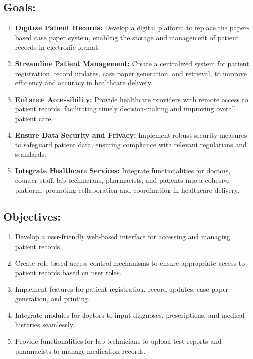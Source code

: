 \subsection{Goals:}

\begin{enumerate}
    \item \textbf{Digitize Patient Records:} Develop a digital platform to replace the paper-based case paper system, enabling the storage and management of patient records in electronic format.
    
    \item \textbf{Streamline Patient Management:} Create a centralized system for patient registration, record updates, case paper generation, and retrieval, to improve efficiency and accuracy in healthcare delivery.
    
    \item \textbf{Enhance Accessibility:} Provide healthcare providers with remote access to patient records, facilitating timely decision-making and improving overall patient care.
    
    \item \textbf{Ensure Data Security and Privacy:} Implement robust security measures to safeguard patient data, ensuring compliance with relevant regulations and standards.
    
    \item \textbf{Integrate Healthcare Services:} Integrate functionalities for doctors, counter staff, lab technicians, pharmacists, and patients into a cohesive platform, promoting collaboration and coordination in healthcare delivery.
\end{enumerate}

\subsection{Objectives:}

\begin{enumerate}
    \item Develop a user-friendly web-based interface for accessing and managing patient records.
    \item Create role-based access control mechanisms to ensure appropriate access to patient records based on user roles.
    \item Implement features for patient registration, record updates, case paper generation, and printing.
    \item Integrate modules for doctors to input diagnoses, prescriptions, and medical histories seamlessly.
    \item Provide functionalities for lab technicians to upload test reports and pharmacists to manage medication records.
\end{enumerate}


